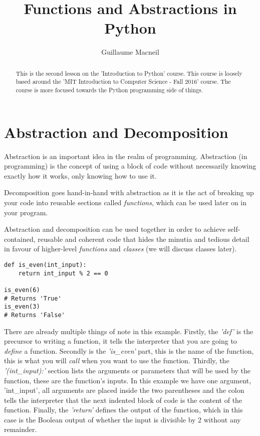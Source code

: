 \documentclass{article}
\title{Functions and Abstractions in Python}
\author{Guillaume Macneil}
\begin{document}
\maketitle

\begin{abstract}
This is the second lesson on the 'Introduction to Python' course. This course is loosely based around the 'MIT Introduction to Computer Science - Fall 2016' course. The course is more focused towards the Python programming side of things.
\end{abstract}

\section{Abstraction and Decomposition}

Abstraction is an important idea in the realm of programming. Abstraction (in programming) is the concept of using a block of code without necessarily knowing exactly how it works, only knowing how to use it. \medskip

Decomposition goes hand-in-hand with abstraction as it is the act of breaking up your code into reusable sections called \textit{functions}, which can be used later on in your program. \medskip

Abstraction and decomposition can be used together in order to achieve self-contained, reusable and coherent code that hides the minutia and tedious detail in favour of higher-level \textit{functions} and \textit{classes} (we will discuss classes later). \medskip

\begin{verbatim}
def is_even(int_input):
    return int_input % 2 == 0

is_even(6)
# Returns 'True'
is_even(3)
# Returns 'False'
\end{verbatim}

There are already multiple things of note in this example. Firstly, the \textit{'def'} is the precursor to writing a function, it tells the interpreter that you are going to \textit{define} a function. Secondly is the \textit{'is\_even'} part, this is the name of the function, this is what you will \textit{call} when you want to use the function. Thirdly, the \textit{'(int\_input):'} section lists the arguments or parameters that will be used by the function, these are the function's inputs. In this example we have one argument, 'int\_input', all arguments are placed inside the two parentheses and the colon tells the interpreter that the next indented block of code is the content of the function. Finally, the \textit{'return'} defines the output of the function, which in this case is the Boolean output of whether the input is divisible by 2 without any remainder. \medskip
\end{document}
